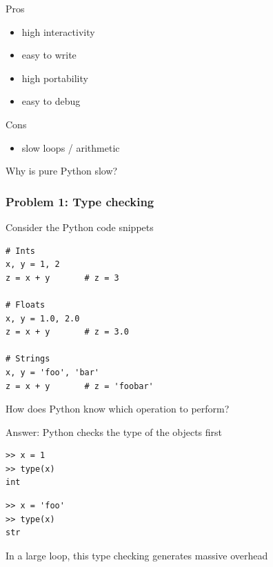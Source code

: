 \documentclass[
    xcolor={svgnames,dvipsnames},
    hyperref={colorlinks, citecolor=DeepPink4, linkcolor=DarkRed, urlcolor=DarkBlue}
    ]{beamer}  %
\newcommand{\1}{\mathbbm 1}
\begin{document}
\begin{frame}

    Pros

    \begin{itemize}
        \item high interactivity
        \item easy to write
        \item high portability
        \item easy to debug
    \end{itemize}

    \vspace{0.5em}

    Cons

    \begin{itemize}
        \item slow loops / arithmetic
    \end{itemize}

    \pause
    \vspace{0.5em}
    \vspace{0.5em}
    Why is pure Python slow?


\end{frame}


\begin{frame}[fragile]
    \frametitle{Problem 1: Type checking}

    Consider the Python code snippets

    \begin{verbatim}
# Ints
x, y = 1, 2
z = x + y       # z = 3

# Floats
x, y = 1.0, 2.0
z = x + y       # z = 3.0

# Strings
x, y = 'foo', 'bar'
z = x + y       # z = 'foobar'
    \end{verbatim}



\end{frame}


\begin{frame}[fragile]
    How does Python know which operation to perform?

    Answer: Python checks the type of the objects first

    \begin{verbatim}
>> x = 1
>> type(x)
int
    \end{verbatim}

    \begin{verbatim}
>> x = 'foo'
>> type(x)
str
    \end{verbatim}


    In a large loop, this type checking generates massive overhead
\end{frame}
\end{document}
